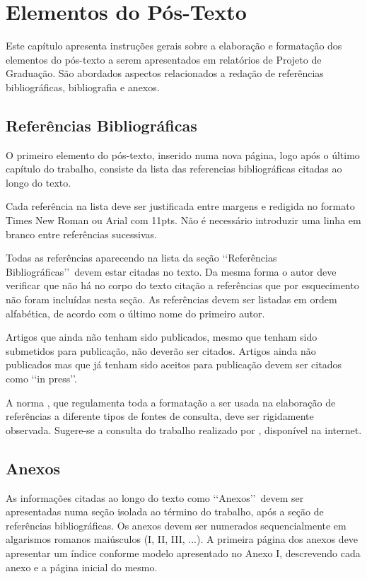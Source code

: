 \chapter[Elementos do Pós-Texto]{Elementos do Pós-Texto}

Este capítulo apresenta instruções gerais sobre a elaboração e formatação dos elementos do pós-texto a serem apresentados em relatórios de Projeto de Graduação. São abordados aspectos relacionados a redação de referências bibliográficas, bibliografia e anexos.

\section{Referências Bibliográficas}

O primeiro elemento do pós-texto, inserido numa nova página, logo após o último capítulo do trabalho, consiste da lista das referencias bibliográficas citadas ao longo do texto.

Cada referência na lista deve ser justificada entre margens e redigida no formato Times New Roman ou Arial com 11pts. Não é necessário introduzir uma linha em branco entre referências sucessivas.

Todas as referências aparecendo na lista da seção \lq\lq Referências Bibliográficas\rq\rq\ devem estar citadas no texto. Da mesma forma o autor deve verificar que não há no corpo do texto citação a referências que por 
esquecimento não foram incluídas nesta seção. As referências devem ser listadas em ordem alfabética, de acordo com o último nome do primeiro autor.

Artigos que ainda não tenham sido publicados, mesmo que tenham sido submetidos para publicação, não deverão ser citados. Artigos ainda não publicados mas que já tenham sido aceitos para publicação devem ser citados como \lq\lq in press\rq\rq.

A norma \cite{NBR6034:2000}, que regulamenta toda a formatação a ser usada na elaboração de referências a diferente tipos de fontes de consulta, deve ser rigidamente observada. Sugere-se a consulta do trabalho realizado por \cite{arruda2007}, disponível na internet.

\section{Anexos}

As informações citadas ao longo do texto como \lq\lq Anexos\rq\rq\ devem ser apresentadas numa seção isolada ao término do trabalho, após a seção de referências bibliográficas. Os anexos devem ser numerados sequencialmente em algarismos romanos maiúsculos (I, II, III, ...). A primeira página dos anexos deve apresentar um índice conforme modelo apresentado no Anexo I, descrevendo cada anexo e a página inicial do mesmo.

